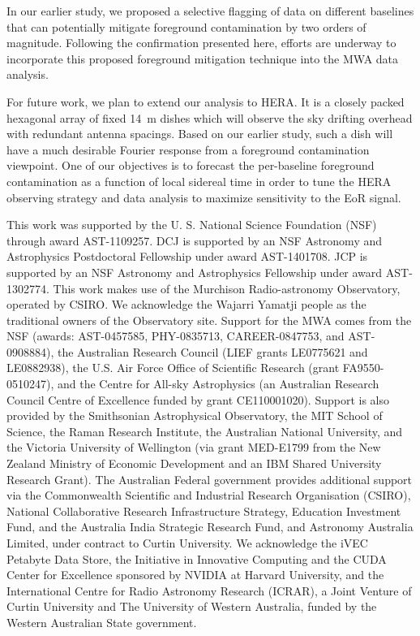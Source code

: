 \documentclass[preprint2,apjl,numberedappendix,twocolappendix,appendixfloats]{emulateapj}
\begin{document}
In our earlier study, we proposed a selective flagging of data on different baselines that can potentially mitigate foreground contamination by two orders of magnitude. Following the confirmation presented here, efforts are underway to incorporate this proposed foreground mitigation technique into the MWA data analysis.

For future work, we plan to extend our analysis to HERA. It is a closely packed hexagonal array of fixed 14~m dishes which will observe the sky drifting overhead with redundant antenna spacings. Based on our earlier study, such a dish will have a much desirable Fourier response from a foreground contamination viewpoint. One of our objectives is to forecast the per-baseline foreground contamination as a function of local sidereal time in order to tune the HERA observing strategy and data analysis to maximize sensitivity to the EoR signal.

\acknowledgments

This work was supported by the U. S. National Science Foundation (NSF) through award AST-1109257. DCJ is supported by an NSF Astronomy and Astrophysics Postdoctoral Fellowship under award AST-1401708. JCP is supported by an NSF Astronomy and Astrophysics Fellowship under award AST-1302774. This work makes use of the Murchison Radio-astronomy Observatory, operated by CSIRO. We acknowledge the Wajarri Yamatji people as the traditional owners of the Observatory site. Support for the MWA comes from the NSF (awards: AST-0457585, PHY-0835713, CAREER-0847753, and AST-0908884), the Australian Research Council (LIEF grants LE0775621 and LE0882938), the U.S. Air Force Office of Scientific Research (grant FA9550-0510247), and the Centre for All-sky Astrophysics (an Australian Research Council Centre of Excellence funded by grant CE110001020). Support is also provided by the Smithsonian Astrophysical Observatory, the MIT School of Science, the Raman Research Institute, the Australian National University, and the Victoria University of Wellington (via grant MED-E1799 from the New Zealand Ministry of Economic Development and an IBM Shared University Research Grant). The Australian Federal government provides additional support via the Commonwealth Scientific and Industrial Research Organisation (CSIRO), National Collaborative Research Infrastructure Strategy, Education Investment Fund, and the Australia India Strategic Research Fund, and Astronomy Australia Limited, under contract to Curtin University. We acknowledge the iVEC Petabyte Data Store, the Initiative in Innovative Computing and the CUDA Center for Excellence sponsored by NVIDIA at Harvard University, and the International Centre for Radio Astronomy Research (ICRAR), a Joint Venture of Curtin University and The University of Western Australia, funded by the Western Australian State government.  
\end{document}
